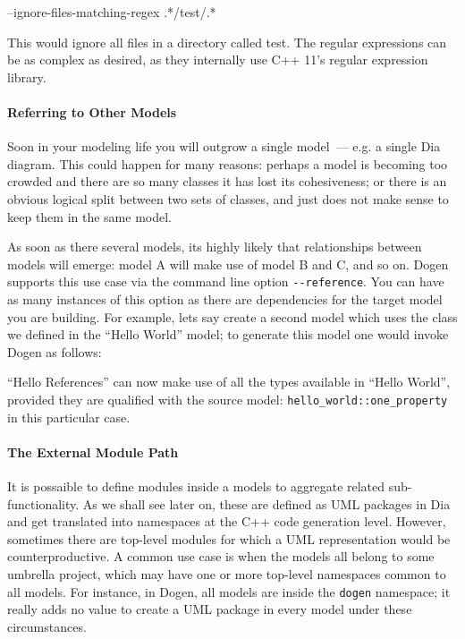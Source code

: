 \documentclass{book}
\begin{document}
\begin{pseudocode}[backgroundcolor=\color{lightgray}]
--ignore-files-matching-regex .*/test/.*
\end{pseudocode}

This would ignore all files in a directory called test. The regular
expressions can be as complex as desired, as they internally use C++
11's regular expression library.

\paragraph{Referring to Other Models}
\label{sec-3-2-9}

Soon in your modeling life you will outgrow a single model~--- e.g. a
single Dia diagram. This could happen for many reasons: perhaps a
model is becoming too crowded and there are so many classes it has
lost its cohesiveness; or there is an obvious logical split between
two sets of classes, and just does not make sense to keep them in the
same model.

As soon as there several models, its highly likely that relationships
between models will emerge: model A will make use of model B and C,
and so on. Dogen supports this use case via the command line option
\texttt{-{}-reference}. You can have as many instances of this option
as there are dependencies for the target model you are building. For
example, lets say create a second model which uses the class we
defined in the ``Hello World'' model; to generate this model one would
invoke Dogen as follows:


``Hello References'' can now make use of all the types available in
``Hello World'', provided they are qualified with the source model:
\texttt{hello\_world::one\_property} in this particular case.

\paragraph{The External Module Path}

It is possaible to define modules inside a models to aggregate related
sub-functionality. As we shall see later on, these are defined as UML
packages in Dia and get translated into namespaces at the C++ code
generation level. However, sometimes there are top-level modules for
which a UML representation would be counterproductive. A common use
case is when the models all belong to some umbrella project, which may
have one or more top-level namespaces common to all models. For
instance, in Dogen, all models are inside the \texttt{dogen}
namespace; it really adds no value to create a UML package in every
model under these circumstances.
\end{document}
